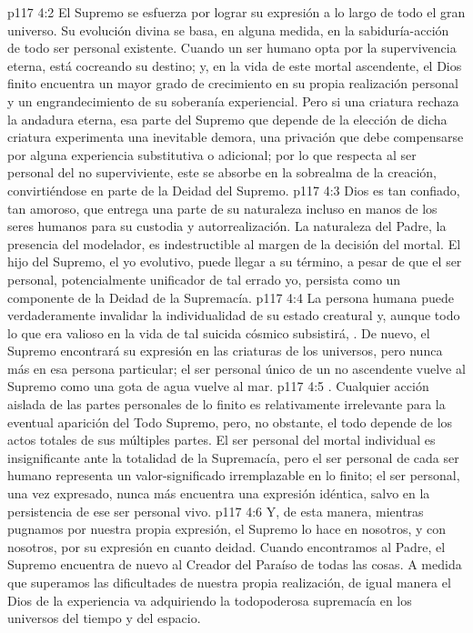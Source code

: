 \vs p117 4:2 El Supremo se esfuerza por lograr su expresión a lo largo de todo el gran universo. Su evolución divina se basa, en alguna medida, en la sabiduría\hyp{}acción de todo ser personal existente. Cuando un ser humano opta por la supervivencia eterna, está cocreando su destino; y, en la vida de este mortal ascendente, el Dios finito encuentra un mayor grado de crecimiento en su propia realización personal y un engrandecimiento de su soberanía experiencial. Pero si una criatura rechaza la andadura eterna, esa parte del Supremo que depende de la elección de dicha criatura experimenta una inevitable demora, una privación que debe compensarse por alguna experiencia substitutiva o adicional; por lo que respecta al ser personal del no superviviente, este se absorbe en la sobrealma de la creación, convirtiéndose en parte de la Deidad del Supremo.
\vs p117 4:3 Dios es tan confiado, tan amoroso, que entrega una parte de su naturaleza incluso en manos de los seres humanos para su custodia y autorrealización. La naturaleza del Padre, la presencia del modelador, es indestructible al margen de la decisión del mortal. El hijo del Supremo, el yo evolutivo, puede llegar a su término, a pesar de que el ser personal, potencialmente unificador de tal errado yo, persista como un componente de la Deidad de la Supremacía.
\vs p117 4:4 La persona humana puede verdaderamente invalidar la individualidad de su estado creatural y, aunque todo lo que era valioso en la vida de tal suicida cósmico subsistirá, . De nuevo, el Supremo encontrará su expresión en las criaturas de los universos, pero nunca más en esa persona particular; el ser personal único de un no ascendente vuelve al Supremo como una gota de agua vuelve al mar.
\vs p117 4:5 . Cualquier acción aislada de las partes personales de lo finito es relativamente irrelevante para la eventual aparición del Todo Supremo, pero, no obstante, el todo depende de los actos totales de sus múltiples partes. El ser personal del mortal individual es insignificante ante la totalidad de la Supremacía, pero el ser personal de cada ser humano representa un valor\hyp{}significado irremplazable en lo finito; el ser personal, una vez expresado, nunca más encuentra una expresión idéntica, salvo en la persistencia de ese ser personal vivo.
\vs p117 4:6 Y, de esta manera, mientras pugnamos por nuestra propia expresión, el Supremo lo hace en nosotros, y con nosotros, por su expresión en cuanto deidad. Cuando encontramos al Padre, el Supremo encuentra de nuevo al Creador del Paraíso de todas las cosas. A medida que superamos las dificultades de nuestra propia realización, de igual manera el Dios de la experiencia va adquiriendo la todopoderosa supremacía en los universos del tiempo y del espacio.
